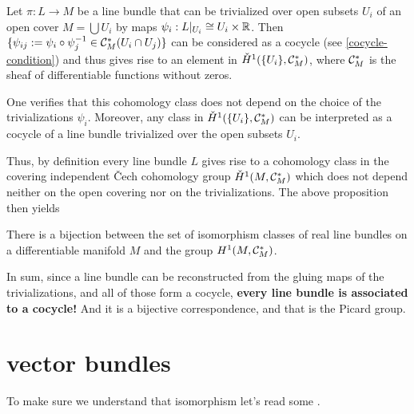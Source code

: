 Let $\pi:L\to M$ be a line bundle that can be trivialized over open subsets $U_i$ of an open cover $M=\bigcup U_i$ by maps $\psi_i:L|_{U_i}\cong U_i\times \mathbb{R}$. Then $\{\psi_{ij}:=\psi_i\circ\psi^{-1}_j\in\mathcal{C}_M^*(U_i\cap U_j)\}$ {\color{red}can be considered as a cocycle (see \cref{cocycle-condition})} and thus gives rise to an element in $\check{H}^1(\{U_i\},\mathcal{C}_M^*)$, where $\mathcal{C}^*_M$ is the sheaf of differentiable functions without zeros.

One verifies that this cohomology class does not depend on the choice of the trivializations $\psi_i$. Moreover, any class in $\check{H}^1(\{U_i\},\mathcal{C}_M^*)$ can be interpreted as a cocycle of a line bundle trivialized over the open subsets $U_i$.

Thus, by definition every line bundle $L$ gives rise to a cohomology class in the covering independent \v Cech cohomology group $\check{H}^1(M,\mathcal{C}^*_M)$ which does not depend neither on the open covering nor on the trivializations. The above proposition then yields

\begin{coro}
	There is a bijection between the set of isomorphism classes of real line bundles on a differentiable manifold $M$ and the group $H^1(M,\mathcal{C}^*_M)$.
\end{coro}

{\color{cyan} In sum, since a line bundle can be reconstructed from the gluing maps of the trivializations, and all of those form a cocycle, \textbf{every line bundle is associated to a cocycle!} And it is a bijective correspondence, and that is the Picard group.}

\section{vector bundles}
To make sure we understand that isomorphism let's read some \cite{hatcher-vb}.

